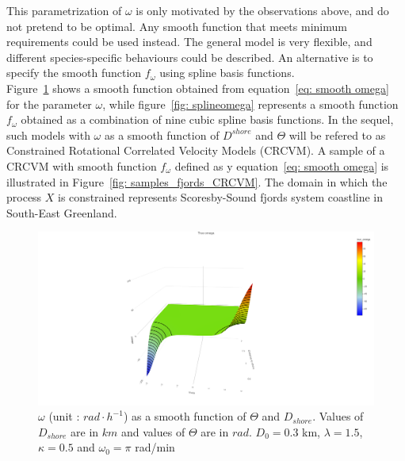 \documentclass[11pt]{article}
\newcommand {\1}{\mathbb{1}}
\begin{document}
This parametrization of $\omega$ is only motivated by the observations above, and do not pretend to be optimal. Any smooth function that meets minimum requirements could be used instead. The general model is very flexible, and different species-specific behaviours could be described. An alternative is to specify the smooth function $f_{\omega}$ using spline basis functions. \\
Figure~\ref{fig: trueomega} shows a smooth function obtained from equation~\ref{eq: smooth omega} for the parameter $\omega$, while figure~\ref{fig: splineomega} represents a smooth function $f_{\omega}$ obtained as a combination of nine cubic spline basis functions. In the sequel, such models with $\omega$ as a smooth function of $D^{shore}$ and $\Theta$ will be refered to as Constrained Rotational Correlated Velocity Models (CRCVM). A sample of a CRCVM with smooth function $f_{\omega}$ defined as y equation~\ref{eq: smooth omega} is illustrated in Figure~\ref{fig: samples_fjords_CRCVM}. The domain in which the process $X$ is constrained represents Scoresby-Sound fjords system coastline in South-East Greenland.


\begin{figure}[H]
	\centering
		\centering
		\includegraphics[scale=0.25]{images/simulation study/true_smooth_omega_rect.png}
		\caption{$\omega$ (unit : $rad \cdot h^{-1}$) as a smooth function of $\Theta$ and $D_{shore}$. Values of $D_{shore}$ are in $km$ and values of $\Theta$ are in $rad$.
		$D_0=0.3$ km, $\lambda=1.5$, $\kappa=0.5$ and $\omega_0=\pi$ rad/min}
		\label{fig: trueomega}
\end{figure}
\end{document}
